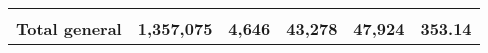 \begin{tabular}{lrcclr}
	& \multicolumn{1}{l}{}                                           & \multicolumn{1}{l}{}                                       & \multicolumn{1}{l}{} &                                                                     & \multicolumn{1}{l}{}                                                         \\
	\rowcolor[HTML]{DDEBF7} 
	\textbf{Total   general}                                       & \textbf{1,357,075}                                             & \multicolumn{1}{r}{\cellcolor[HTML]{DDEBF7}\textbf{4,646}} & \textbf{43,278}      & \textbf{47,924}                                                     & \textbf{353.14}                                                             
\end{tabular}